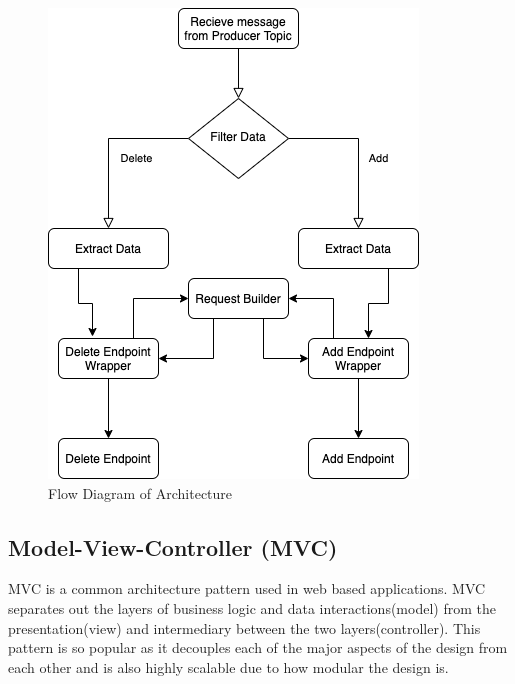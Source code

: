 \begin{figure}[ht]
  \centering
  \includegraphics[scale=0.7]{multicurrency/multi.png}
  \caption{Flow Diagram of Architecture}
\end{figure}

\subsection{Model-View-Controller (MVC)}
MVC is a common architecture pattern used in web based applications. MVC separates out the layers of business logic and data interactions(model) from the presentation(view) and intermediary between the two layers(controller). This pattern is so popular as it decouples each of the major aspects of the design from each other and is also highly scalable due to how modular the design is.


